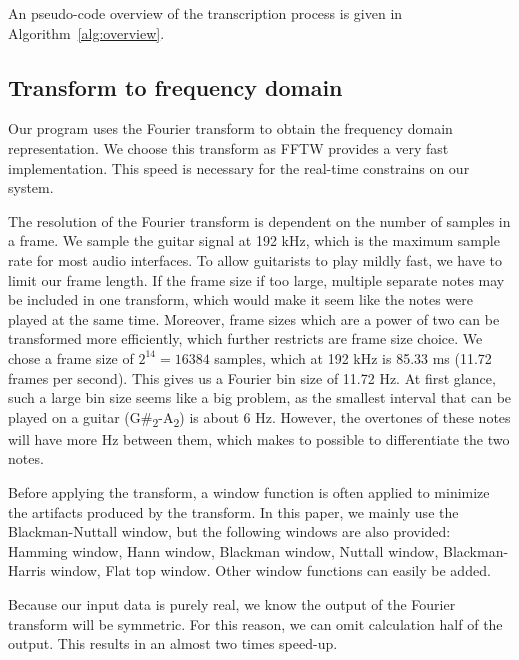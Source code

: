 \documentclass[10pt,twocolumn]{article}
\begin{document}
An pseudo-code overview of the transcription process is given in Algorithm~\ref{alg:overview}.


\subsection{Transform to frequency domain}  \label{sub:four}
Our program uses the Fourier transform to obtain the frequency domain representation. We choose this transform as FFTW provides a very fast implementation. This speed is necessary for the real-time constrains on our system.

The resolution of the Fourier transform is dependent on the number of samples in a frame. We sample the guitar signal at 192 kHz, which is the maximum sample rate for most audio interfaces. To allow guitarists to play mildly fast, we have to limit our frame length. If the frame size if too large, multiple separate notes may be included in one transform, which would make it seem like the notes were played at the same time. Moreover, frame sizes which are a power of two can be transformed more efficiently, which further restricts are frame size choice. We chose a frame size of $2^{14} = 16384$ samples, which at 192 kHz is 85.33 ms (11.72 frames per second). This gives us a Fourier bin size of 11.72 Hz. At first glance, such a large bin size seems like a big problem, as the smallest interval that can be played on a guitar (G\#\textsubscript{2}-A\textsubscript{2}) is about 6 Hz. However, the overtones of these notes will have more Hz between them, which makes to possible to differentiate the two notes.%

Before applying the transform, a window function is often applied to minimize the artifacts produced by the transform. In this paper, we mainly use the Blackman-Nuttall window, but the following windows are also provided: Hamming window, Hann window, Blackman window, Nuttall window, Blackman-Harris window, Flat top window. Other window functions can easily be added.

Because our input data is purely real, we know the output of the Fourier transform will be symmetric. For this reason, we can omit calculation half of the output. This results in an almost two times speed-up\cite{twotimes}.
\end{document}
